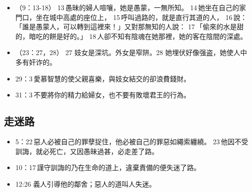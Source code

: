\begin{itemize}
\item （9：13-18） 13 愚昧的婦人喧嚷，她是愚蒙，一無所知。 14 她坐在自己的家門口，坐在城中高處的座位上， 15 呼叫過路的，就是直行其道的人， 16 說：「誰是愚蒙人，可以轉到這裡來！」又對那無知的人說： 17 「偷來的水是甜的，暗吃的餅是好的。」 18 人卻不知有陰魂在她那裡，她的客在陰間的深處。
\item （23：27，28） 27 妓女是深坑。外女是窄阱。28 她埋伏好像强盗，她使人中多有奸诈的。
\item 29：3 愛慕智慧的使父親喜樂，與妓女結交的卻浪費錢財。
\item 31：3 不要將你的精力給婦女，也不要有敗壞君王的行為。
\end{itemize}

\subsection{走迷路}
\begin{itemize}
\itemsep-.45em 
\item 5：22 惡人必被自己的罪孽捉住，他必被自己的罪惡如繩索纏繞。 23 他因不受訓誨，就必死亡，又因愚昧過甚，必走差了路。
\item 10：17 謹守訓誨的乃在生命的道上，違棄責備的便失迷了路。
\item 12:26 義人引導他的鄰舍；惡人的道叫人失迷。
\end{itemize}

